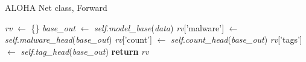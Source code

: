 \documentclass[pdfa%
,cucitura%
]{toptesi}
\begin{document}
\begin{algorithm}[h]
	\caption{ALOHA Net class, Forward}\label{alg:alohaNetForward}
	\begin{algorithmic}[1]
			\State \textit{rv} $\gets$ \{\}
			\State \textit{base\_out} $\gets$ \textit{self}.\textit{model\_base}(\textit{data})
			\State
				\State \textit{rv}['malware'] $\gets$ \textit{self}.\textit{malware\_head}(\textit{base\_out})
			\EndIf
			\State
				\State \textit{rv}['count'] $\gets$ \textit{self}.\textit{count\_head}(\textit{base\_out})
			\EndIf
			\State
				\State \textit{rv}['tags'] $\gets$ \textit{self}.\textit{tag\_head}(\textit{base\_out})
			\EndIf
			\State
			\State \textbf{return} \textit{rv}
		\EndFunction
	\end{algorithmic}
\end{algorithm}
\end{document}
